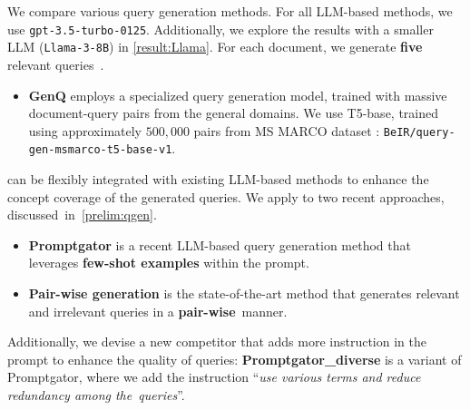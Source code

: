 We compare various query generation methods.
For all LLM-based methods, we use \texttt{gpt-3.5-turbo-0125}.
Additionally, we explore the results with a smaller LLM (\texttt{Llama-3-8B}) in \cref{result:Llama}.
For each document, we generate \textbf{five} relevant queries~\cite{BEIR}.
\begin{itemize}[leftmargin=*]\vspace{-0.7\topsep}
    \item \textbf{GenQ} \cite{BEIR} employs a specialized query generation model, trained with massive document-query pairs from the general domains.
    We use T5-base, trained using approximately $500,000$ pairs from MS MARCO dataset \cite{nogueira2019doc2query}: \texttt{BeIR/query-gen-msmarco-t5-base-v1}.
\end{itemize}
\noindent
\proposed can be flexibly integrated with existing LLM-based methods to enhance the concept coverage of the generated queries.
We apply \proposed to two recent approaches,  discussed~in~\cref{prelim:qgen}.
\begin{itemize}[leftmargin=*]\vspace{-0.7\topsep}
    \item \textbf{Promptgator} \cite{dai2022promptagator} is a recent LLM-based query generation method that leverages \textbf{few-shot examples} within the prompt. 
    

    \item \textbf{Pair-wise generation} \cite{pairwise_qgen} is the state-of-the-art method that generates relevant and irrelevant queries in a \textbf{pair-wise}~manner.
\end{itemize}
Additionally, we devise a new competitor that adds more instruction in the prompt to enhance the quality of queries:
\textbf{Promptgator\_{diverse}} is a variant of Promptgator, where we add the instruction ``\textit{use various terms and reduce redundancy among the~queries}''.


